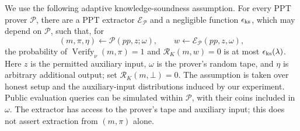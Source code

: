 \documentclass[10pt,letterpaper]{article}
\newcommand{\Verify}{\operatorname{Verify}}
\begin{document}
We use the following adaptive knowledge-soundness assumption. For every PPT prover $\mathcal P$, there are a PPT extractor $\mathcal E_{\mathcal P}$ and a negligible function $\epsilon_{\rm ks}$, which may depend on $\mathcal P$, such that, for
\[
 (m,\pi,\eta)\leftarrow\mathcal P(pp,z;\omega),\qquad
 w\leftarrow\mathcal E_{\mathcal P}(pp,z,\omega),
\]
the probability of $\Verify_\nu(m,\pi)=1$ and $\mathcal R_K(m,w)=0$ is at most $\epsilon_{\rm ks}(\lambda)$. Here $z$ is the permitted auxiliary input, $\omega$ is the prover's random tape, and $\eta$ is arbitrary additional output; set $\mathcal R_K(m,\bot)=0$. The assumption is taken over honest setup and the auxiliary-input distributions induced by our experiment. Public evaluation queries can be simulated within $\mathcal P$, with their coins included in $\omega$. The extractor has access to the prover's tape and auxiliary input; this does not assert extraction from $(m,\pi)$ alone.
\end{document}
